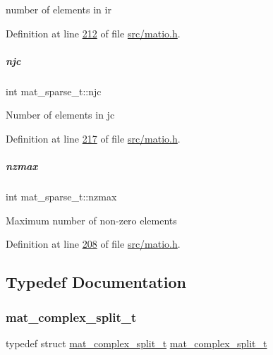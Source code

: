 number of elements in ir 

Definition at line \hyperlink{src_2matio_8h_source_l00212}{212} of file \hyperlink{src_2matio_8h_source}{src/matio.\+h}.

\mbox{\label{group___m_a_t_a482d8e4b40aa975f0c1daf146ebe08a4}} 
\subparagraph{\texorpdfstring{njc}{njc}}
{\footnotesize\ttfamily int mat\+\_\+sparse\+\_\+t\+::njc}

Number of elements in jc 

Definition at line \hyperlink{src_2matio_8h_source_l00217}{217} of file \hyperlink{src_2matio_8h_source}{src/matio.\+h}.

\mbox{\label{group___m_a_t_ad79471861cb948e32671be6d4089173a}} 
\subparagraph{\texorpdfstring{nzmax}{nzmax}}
{\footnotesize\ttfamily int mat\+\_\+sparse\+\_\+t\+::nzmax}

Maximum number of non-\/zero elements 

Definition at line \hyperlink{src_2matio_8h_source_l00208}{208} of file \hyperlink{src_2matio_8h_source}{src/matio.\+h}.



\subsection{Typedef Documentation}
\mbox{\label{group___m_a_t_ga5604ebdeb88bb44efb635496740442bc}} 
\subsubsection{\texorpdfstring{mat\+\_\+complex\+\_\+split\+\_\+t}{mat\_complex\_split\_t}\hspace{0.1cm}{\footnotesize\ttfamily [1/2]}}
{\footnotesize\ttfamily typedef struct \hyperlink{group___m_a_t_structmat__complex__split__t}{mat\+\_\+complex\+\_\+split\+\_\+t}  \hyperlink{group___m_a_t_structmat__complex__split__t}{mat\+\_\+complex\+\_\+split\+\_\+t}}



